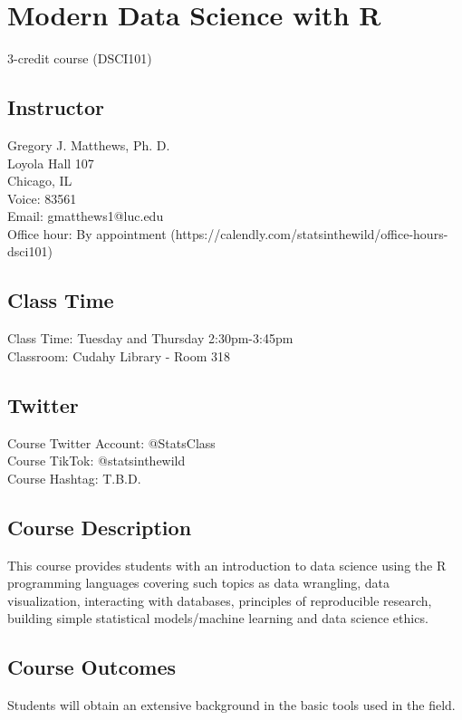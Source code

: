 \documentclass{article}\usepackage[]{graphicx}\usepackage[]{color}
\begin{document}

\section*{Modern Data Science with R}
3-credit course (DSCI101)

\subsection*{Instructor}
Gregory J. Matthews, Ph. D.\\
Loyola Hall 107 \\
Chicago, IL \\
Voice: 83561\\
Email: gmatthews1@luc.edu\\
Office hour: By appointment (https://calendly.com/statsinthewild/office-hours-dsci101)


\subsection*{Class Time}
Class Time: Tuesday and Thursday 2:30pm-3:45pm \\
Classroom:  Cudahy Library - Room 318 \\

\subsection*{Twitter}
Course Twitter Account: @StatsClass\\
Course TikTok: @statsinthewild\\
Course Hashtag: T.B.D.


\subsection*{Course Description}
This course provides students with an introduction to data science using the R programming languages covering such topics as data wrangling, data visualization, interacting with databases, principles of reproducible research, building simple statistical models/machine learning and data science ethics.

\subsection*{Course Outcomes}
Students will obtain an extensive background in the basic tools used in the field.
\end{document}

